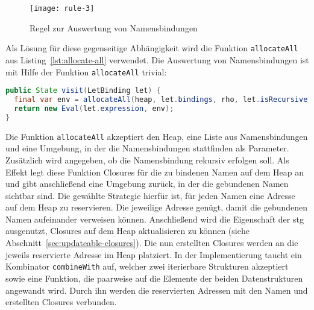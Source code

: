 \begin{figure}[h]
  \centering
  \texttt{[image: rule-3]}
  \caption{Regel zur Auswertung von Namensbindungen}\label{fig:stg-rule3}
\end{figure}


Als Lösung für diese gegenseitige Abhängigkeit wird die Funktion \texttt{allocateAll} aus Listing~\ref{lst:allocate-all} verwendet.
Die Auswertung von Namensbindungen ist mit Hilfe der Funktion \texttt{allocateAll} trivial:

\begin{lstlisting}[language=java]
public State visit(LetBinding let) {
  final var env = allocateAll(heap, let.bindings, rho, let.isRecursive);
  return new Eval(let.expression, env);
}
\end{lstlisting}

Die Funktion \texttt{allocateAll} akzeptiert den Heap, eine Liste aus Namensbindungen und eine Umgebung, in der die Namensbindungen stattfinden als Parameter.
Zusätzlich wird angegeben, ob die Namensbindung rekursiv erfolgen soll.
Als Effekt legt diese Funktion Closures für die zu bindenen Namen auf dem Heap an und gibt anschließend eine Umgebung zurück, in der die gebundenen Namen sichtbar sind.
Die gewählte Strategie hierfür ist, für jeden Namen eine Adresse auf dem Heap zu reservieren.
Die jeweilige Adresse genügt, damit die gebundenen Namen aufeinander verweisen können.
Anschließend wird die Eigenschaft der \gls{stg} ausgenutzt, Closures auf dem Heap aktualisieren zu können (siehe Abschnitt~\ref{sec:updateable-closures}).
Die nun erstellten Closures werden an die jeweils reservierte Adresse im Heap platziert.
In der Implementierung taucht ein Kombinator \texttt{combineWith} auf, welcher zwei iterierbare Strukturen akzeptiert sowie eine Funktion, die paarweise auf die Elemente der beiden Datenstrukturen angewandt wird.
Durch ihn werden die reservierten Adressen mit den Namen und erstellten Closures verbunden.

\vfill

